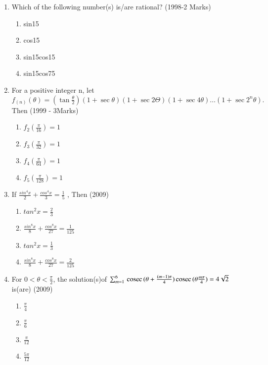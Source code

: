 \documentclass[journal,12pt,twocolumn]{IEEEtran}
\theoremstyle{remark}
\begin{document}
\begin{enumerate}
\item Which of the following number(s) is/are rational? \hfill(1998-2 Marks) \
\begin{enumerate}
    \item sin15\degree
    \item cos15\degree
    \item sin15\degree cos15\degree
    \item sin15\degree cos75\degree
\end{enumerate}
\item For a positive integer n, let \ 
$f_(n)(\theta) = (\tan\frac{\theta}{2})(1+\sec\theta)(1+\sec2\Theta)(1+\sec4\theta)\dots(1+\sec2^n\theta).$ Then (1999 - 3Marks)
\begin{enumerate}
    \item $f_2(\frac{\pi}{16}) = 1$
    \item $f_3(\frac{\pi}{32}) = 1$
    \item $f_4(\frac{\pi}{64}) = 1$
    \item $f_5(\frac{\pi}{128}) = 1$
\end{enumerate}
\item If $\frac{sin^4x}{2}+\frac{cos^4x}{3}=\frac{1}{5}$ , Then \hfill(2009) \
\begin{enumerate}
    \item $tan^2x=\frac{2}{3}$
    \item $\frac{sin^8x}{8}+\frac{cos^8x}{27}=\frac{1}{125}$
    \item $tan^2x=\frac{1}{3}$
    \item $\frac{sin^8x}{8}+\frac{cos^8x}{27}=\frac{2}{125}$
\end{enumerate}
\item For $ 0< \theta <\frac{\pi}{2}$, the solution(s)of $\sum_{m=1}^{6}\,\text{cosec}\,(\theta+\frac{(m-1)\pi}{4})\,\text{cosec}\,(\theta\frac{m\pi}{4}) = 4\sqrt{2}$ is(are) \hfill(2009) \
\begin{enumerate}
    \item $\frac{\pi}{4}$
    \item $\frac{\pi}{6}$
    \item $\frac{\pi}{12}$
    \item $\frac{5\pi}{12}$
\end{enumerate}


\end{enumerate}
\end{document}
